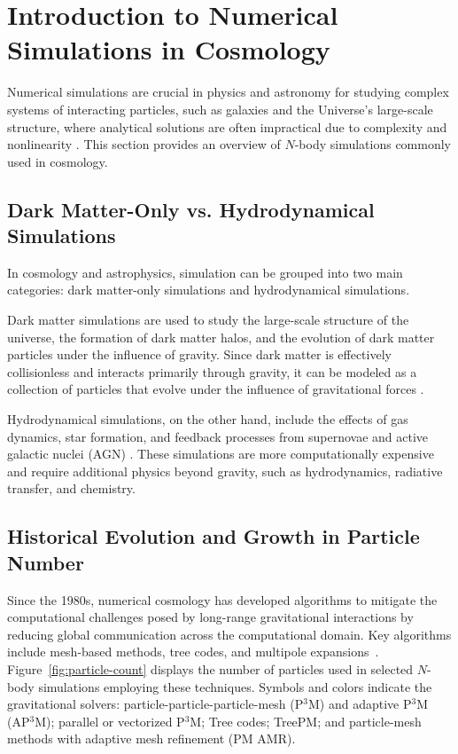 \section{Introduction to Numerical Simulations in Cosmology}
Numerical simulations are crucial in physics and astronomy for studying complex systems of interacting particles, such as galaxies and the Universe's large-scale structure, where analytical solutions are often impractical due to complexity and nonlinearity \citep{1981csup.book.....H, 1985ApJS...57..241E, 2005Natur.435..629S, 2005MNRAS.364.1105S}. This section provides an overview of $N$-body simulations commonly used in cosmology.

\subsection{Dark Matter-Only vs. Hydrodynamical Simulations}
In cosmology and astrophysics, simulation can be grouped into two main categories: dark matter-only simulations and hydrodynamical simulations. 

Dark matter simulations are used to study the large-scale structure of the universe, the formation of dark matter halos, and the evolution of dark matter particles under the influence of gravity. Since dark matter is effectively collisionless and interacts primarily through gravity, it can be modeled as a collection of particles that evolve under the influence of gravitational forces \citep{1985ApJS...57..241E}. 

Hydrodynamical simulations, on the other hand, include the effects of gas dynamics, star formation, and feedback processes from supernovae and active galactic nuclei (AGN) \citep{1989ApJS...70..419H, 2005Natur.435..629S, 2005MNRAS.364.1105S}. These simulations are more computationally expensive and require additional physics beyond gravity, such as hydrodynamics, radiative transfer, and chemistry.

\subsection{Historical Evolution and Growth in Particle Number}
Since the 1980s, numerical cosmology has developed algorithms to mitigate the computational challenges posed by long-range gravitational interactions by reducing global communication across the computational domain. Key algorithms include mesh-based methods, tree codes, and multipole expansions~\citep{1981csup.book.....H}. Figure~\ref{fig:particle-count} displays the number of particles used in selected $N$-body simulations employing these techniques. Symbols and colors indicate the gravitational solvers: particle-particle-particle-mesh (P$^3$M) and adaptive P$^3$M (AP$^3$M); parallel or vectorized P$^3$M; Tree codes; TreePM; and particle-mesh methods with adaptive mesh refinement (PM AMR).


